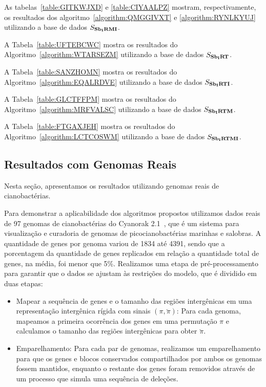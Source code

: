 As tabelas~\ref{table:GITKWJXD} e \ref{table:CIYAALPZ} mostram, respectivamente, os resultados dos algoritmo~\ref{algorithm:QMGGIVXT} e \ref{algorithm:RYNLKYUJ} utilizando a base de dados $S_{\textbf{Sb\textsubscript{I}RMI}}{}$.





A Tabela~\ref{table:UFTEBCWC} mostra os resultados do Algoritmo~\ref{algorithm:WTARSEZM} utilizando a base de dados $S_{\textbf{Sb\textsubscript{I}RT}}{}$.



A Tabela~\ref{table:SANZHOMN} mostra os resultados do Algoritmo~\ref{algorithm:EQALRDVE} utilizando a base de dados $S_{\textbf{Sb\textsubscript{I}RTI}}{}$.



A Tabela~\ref{table:GLCTFFPM} mostra os resultados do Algoritmo~\ref{algorithm:MRFVALSC} utilizando a base de dados $S_{\textbf{Sb\textsubscript{I}RTM}}{}$.



A Tabela~\ref{table:FTGAXJEH} mostra os resultados do Algoritmo~\ref{algorithm:LCTCOSWM} utilizando a base de dados $S_{\textbf{Sb\textsubscript{I}RTMI}}{}$.




\subsection{Resultados com Genomas Reais}

Nesta seção, apresentamos os resultados utilizando genomas reais de cianobactérias.

Para demonstrar a aplicabilidade dos algoritmos propostos utilizamos dados reais de 97 genomas de cianobactérias do Cyanorak 2.1~\cite{cyanorak}, que é um sistema para visualização e curadoria de genomas de picocianobactérias marinhas e salobras. A quantidade de genes por genoma variou de 1834 até 4391, sendo que a porcentagem da quantidade de genes replicados em relação a quantidade total de genes, na média, foi menor que 5\%. Realizamos uma etapa de pré-processamento para garantir que o dados se ajustam às restrições do modelo, que é dividido em duas etapas:
\begin{itemize}
  \item Mapear a sequência de genes e o tamanho das regiões intergênicas em uma representação intergênica rígida com sinais $(\pi,\breve\pi)$: Para cada genoma, mapeamos a primeira ocorrência dos genes em uma permutação $\pi$ e calculamos o tamanho das regiões intergênicas para obter $\breve\pi$.
  \item Emparelhamento: Para cada par de genomas, realizamos um emparelhamento para que os genes e blocos conservados compartilhados por ambos os genomas fossem mantidos, enquanto o restante dos genes foram removidos através de um processo que simula uma sequência de deleções.
\end{itemize}

